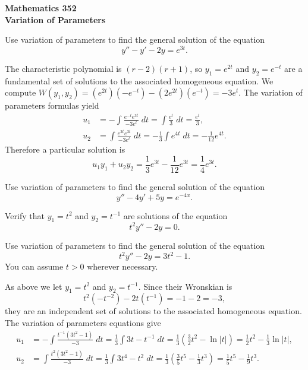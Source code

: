 \documentclass[answers,11pt]{exam}
\begin{document}
\noindent
\textbf{{\large Mathematics 352 \\ Variation of Parameters}}

\begin{questions}

\question Use variation of parameters to find the general solution of the equation
\[
    y'' - y' - 2y = e^{3t}.
\]

\begin{solution}
    The characteristic polynomial is $(r - 2)(r + 1)$, so $y_1 = e^{2t}$ and $y_2 = e^{-t}$ are a fundamental set of solutions to the associated homogeneous equation. We compute $W(y_1, y_2) = (e^{2t})(-e^{-t}) - (2e^{2t})(e^{-t}) = -3e^{t}$. The variation of parameters formulas yield
    \begin{align*}
        u_1 &= -\int \frac{e^{-t} e^{3t}}{-3e^t} \; dt = \int \frac{e^t}{3} \; dt = \frac{e^t}{3}, \\
        u_2 &= \int \frac{e^{2t} e^{3t}}{-3e^t} \; dt = -\frac{1}{3} \int e^{4t} \; dt = -\frac{1}{12} e^{4t}.
    \end{align*}
    Therefore a particular solution is
    \[
        u_1 y_1 + u_2 y_2 = \frac{1}{3} e^{3t} - \frac{1}{12} e^{3t} = \frac{1}{4} e^{3t}.
    \]
\end{solution}

\question Use variation of parameters to find the general solution of the equation
\[
    y'' - 4y' + 5y = e^{-4x}.
\]

\question Verify that $y_1 = t^2$ and $y_2 = t^{-1}$ are solutions of the equation
\[
    t^2 y'' - 2y = 0.
\]

\question Use variation of parameters to find the general solution of the equation
\[
    t^2 y'' - 2y = 3t^2 - 1.
\]
You can assume $t > 0$ wherever necessary.

\begin{solution}
    As above we let $y_1 = t^2$ and $y_2 = t^{-1}$. Since their Wronskian is 
    \[
        t^2 (-t^{-2}) - 2t(t^{-1}) = -1 -2 = -3,
    \]
    they are an independent set of solutions to the associated homogeneous equation. The variation of parameters equations give
    \begin{align*}
        u_1 &= -\int \frac{t^{-1} (3t^2 - 1)}{-3} \; dt = \frac{1}{3} \int 3t - t^{-1} \; dt = \frac{1}{3} \left(\frac{3}{2} t^2 - \ln |t|\right) = \frac{1}{2} t^2 - \frac{1}{3} \ln |t|, \\
        u_2 &= \int \frac{t^2(3t^2-1)}{-3} \; dt = \frac{1}{3} \int 3t^4 - t^2 \; dt = \frac{1}{3} \left( \frac{3}{5}t^5 - \frac{1}{3}t^3 \right) = \frac{1}{5} t^5 - \frac{1}{9} t^3.
    \end{align*}
\end{solution}

\end{questions}
\end{document}

